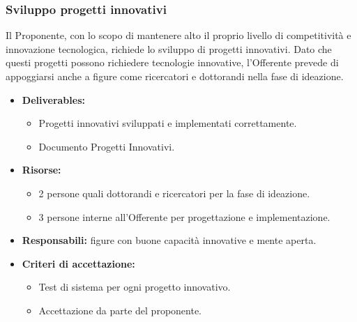 			\subsubsection{Sviluppo progetti innovativi}
            	Il Proponente, con lo scopo di mantenere alto il proprio livello di competitività e innovazione tecnologica, richiede lo sviluppo di progetti innovativi. Dato che questi progetti possono richiedere tecnologie innovative, l'Offerente prevede di appoggiarsi anche a figure come ricercatori e dottorandi nella fase di ideazione.
                
                \begin{itemize}
               		\item  \textbf{Deliverables:} 
                    \begin{itemize}
                    	\item Progetti innovativi sviluppati e implementati correttamente.
                        \item Documento Progetti Innovativi.
                    \end{itemize}
                                       
                    \item  \textbf{Risorse:} 
                	\begin{itemize}
                		\item 2 persone quali dottorandi e ricercatori per la fase di ideazione.
                        \item 3 persone interne all'Offerente per progettazione e implementazione.
                	\end{itemize}
                    \item  \textbf{Responsabili:} figure con buone capacità innovative e mente aperta.
                    \item  \textbf{Criteri di accettazione:} 
                    \begin{itemize}
                    	\item Test di sistema per ogni progetto innovativo.
                        \item Accettazione da parte del proponente.
                    \end{itemize}
                	\end{itemize}
                    
